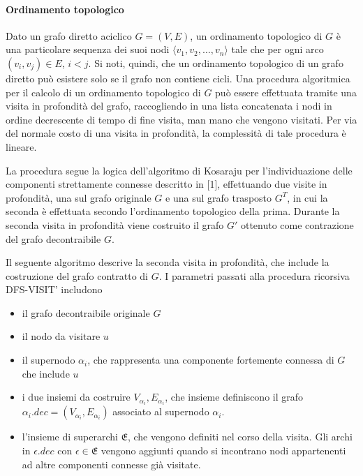 \paragraph{Ordinamento topologico}
Dato un grafo diretto aciclico $G = (V, E)$, un ordinamento topologico di $G$ \`e una particolare sequenza
dei suoi nodi $\langle v_1, v_2, \ldots, v_n \rangle$ tale che per ogni arco $(v_i, v_j) \in E$, $i < j$.
Si noti, quindi, che un ordinamento topologico di un grafo diretto pu\`o esistere solo se il grafo non contiene
cicli.
Una procedura algoritmica per il calcolo di un ordinamento topologico di $G$ pu\`o essere effettuata tramite una
visita in profondit\`a del grafo, raccogliendo in una lista concatenata i nodi in ordine decrescente di tempo
di fine visita, man mano che vengono visitati.
Per via del normale costo di una visita in profondit\`a, la complessit\`a di tale procedura \`e lineare.





La procedura segue la logica dell'algoritmo di Kosaraju per l'individuazione delle componenti strettamente connesse
descritto in [1], effettuando due visite in profondit\`a, una sul grafo originale $G$ e una sul grafo trasposto
$G^T$, in cui la seconda \`e effettuata secondo l'ordinamento topologico della prima.
Durante la seconda visita in profondit\`a viene costruito il grafo $G\mathcal{'}$ ottenuto come contrazione del
grafo decontraibile $G$.

    

    Il seguente algoritmo descrive la seconda visita in profondit\`a, che include la costruzione del grafo
    contratto di $G$. \newline
    I parametri passati alla procedura ricorsiva DFS-VISIT' includono
    \begin{itemize}
        \item il grafo decontraibile originale  $G$
        \item il nodo da  visitare $u$
        \item il supernodo $\alpha_i$, che rappresenta una componente fortemente connessa di $G$ che include $u$
        \item i due insiemi da costruire $V_{\alpha_i}, E_{\alpha_i}$, che insieme definiscono il grafo $\alpha_i.dec = (V_{\alpha_i}, E_{\alpha_i})$ 
		associato al supernodo $\alpha_i$.
	    \item l'insieme di superarchi $\mathfrak{E}$, che vengono definiti nel corso della visita.
		Gli archi in $\epsilon.dec$ con $\epsilon \in \mathfrak{E}$ vengono aggiunti quando si incontrano nodi appartenenti
        ad altre componenti connesse gi\`a visitate.
    \end{itemize}

